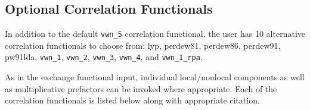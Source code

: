   
\subsection{Optional Correlation Functionals}

In addition to the default \verb+vwn_5+ correlation functional, the user has
10 alternative correlation functionals to choose from: lyp, perdew81,
perdew86, perdew91, pw91lda, \verb+vwn_1+, \verb+vwn_2+, \verb+vwn_3+,
\verb+vwn_4+, and \verb+vwn_1_rpa+.

As in the exchange functional input, individual local/nonlocal
components as well as multiplicative prefactors can be invoked where
appropriate.  Each of the correlation functionals is listed below along with
appropriate citation. 

\sloppy


